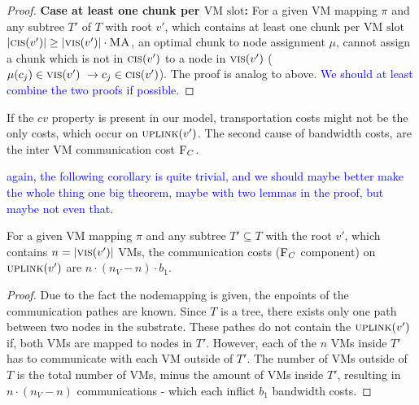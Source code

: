 \documentclass[9pt,twocolumn]{scrartcl}
\newcommand{\VmSlot}{\text{VM slot}}
\newcommand{\stefan}[1]{\textcolor{blue}{#1}}
\newcommand{\MaFactor}{\ensuremath{\textsc{MA}}}
\newcommand{\VmChunkAssignment}{\mu}
\newcommand{\NodeMapping}{\pi}
\newcommand{\SubstrateNode}{\ensuremath{v}}
\newcommand{\Opt}{\ensuremath{Opt}}
\newcommand{\Uplink}{\ensuremath{\textsc{uplink}}}
\newcommand{\ChunkCount}{\ensuremath{\textsc{cis}}}
\newcommand{\VmCount}{\ensuremath{\textsc{vis}}}
\newcommand{\achunk}{\ensuremath{c}}
\newcommand{\Cost}{\textsc{F}}
\newcommand{\Tree}{\ensuremath{T}}
\newcommand{\CostCom}{\ensuremath{b_1}}
\newcommand{\CostTrans}{\ensuremath{b_2}}
\newcommand{\Vms}{\ensuremath{n_V}}
\begin{document}
\begin{proof}
\textbf{Case at least one chunk per $\VmSlot$:}
For a given VM mapping $\NodeMapping$ and any subtree $\Tree'$ of $\Tree$ with 
root $\SubstrateNode'$, which contains at least one chunk per
$\VmSlot$ $|\ChunkCount(\SubstrateNode')| \geq |\VmCount(\SubstrateNode')|
\cdot \MaFactor$, an
optimal chunk to node assignment $\VmChunkAssignment$, cannot assign a chunk
which is not in $\ChunkCount(\SubstrateNode')$ to a node in
$\VmCount(\SubstrateNode')$ ($\VmChunkAssignment(\achunk_j) \in
\VmCount(\SubstrateNode')~ \rightarrow \achunk_j \in
\ChunkCount(\SubstrateNode')$).
 The proof is analog to above. 
\stefan{We should at least combine the two proofs if possible.}
\end{proof}

If the $cv$ property is present in our model, transportation costs might not be
the only costs, which occur on $\Uplink(\SubstrateNode')$. The second cause of
bandwidth costs, are the inter VM communication cost $\Cost_C$.

\stefan{again, the following corollary is quite trivial, and we should maybe better make the whole
thing one big theorem, maybe with two lemmas in the proof, but maybe not even that.}

\begin{corollary}
\label{corollary:comCost}
 For a given VM mapping $\NodeMapping$ and any subtree $\Tree' \subseteq
\Tree$ with the root $\SubstrateNode'$, which contains $n
= |\VmCount(\SubstrateNode')|$ VMs, the communication costs ($\Cost_C$
component) on
$\Uplink(\SubstrateNode')$ are $n \cdot (\Vms - n)
\cdot
\CostCom$.
\end{corollary}

\begin{proof}
Due to the fact the nodemapping is given, the enpoints of the communication
pathes are known. Since $\Tree$ is a tree, there exists only one path between
two nodes in the substrate. These pathes do not contain the
$\Uplink(\SubstrateNode')$ if, both VMs are mapped to nodes in $\Tree'$.
However, each of the $n$ VMs inside $\Tree'$ has to communicate with each VM
outside of $\Tree'$. The number of VMs outside of $\Tree$ is the total number
of VMs, minus the amount of VMs inside $\Tree'$, resulting in $n \cdot (\Vms -
n)$ communications - which each inflict $\CostCom$ bandwidth costs.
\end{proof}

%
\newcommand{\NodesToProcess}{\ensuremath{\textsc{nodesToProcess}}}
\end{document}
